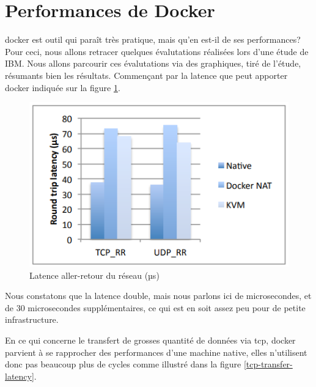 \documentclass[
    iai, %
    il, %
]{heig-tb}
\begin{document}
\section{Performances de Docker}
\Gls{docker} est outil qui paraît très pratique, mais qu'en est-il de ses performances?
Pour ceci, nous allons retracer quelques évalutations réalisées lors d'une étude de IBM. Nous allons parcourir ces évalutations via des graphiques, tiré de l'étude, résumants bien les résultats.
Commençant par la latence que peut apporter \Gls{docker} indiquée sur la figure \ref{network-latency}.

\begin{center}
    \begin{figure}[H]
        \includegraphics[width=\textwidth]{./assets/figures/docker-perf-latency.png}
        \caption[Docker latence aller-retour du réseau]{Latence aller-retour du réseau (µs) \cite{rad2017introduction} \label{network-latency}}
    \end{figure}
\end{center}

Nous constatons que la latence double, mais nous parlons ici de microsecondes, et de 30 microsecondes supplémentaires, ce qui est en soit assez peu pour de petite infrastructure.

En ce qui concerne le transfert de grosses quantité de données via \gls{tcp}, \Gls{docker} parvient à se
rapprocher des performances d'une machine native, elles n'utilisent donc pas beaucoup plus de cycles
comme illustré dans la figure \ref{tcp-transfer-latency}.
\end{document}
